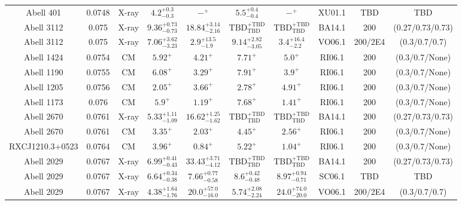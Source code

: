 \begin{table}
\begin{tabular}{cccccccccc}
Abell 401 & 0.0748 & X-ray & ${4.2}^{+0.3}_{-0.3}$ & ${-}^{+}_{}$ & ${5.5}^{+0.4}_{-0.4}$ & ${-}^{+}_{}$ & XU01.1 & TBD & TBD \\
Abell 3112 & 0.075 & X-ray & ${9.36}^{+0.73}_{-0.73}$ & ${18.84}^{+3.14}_{-2.16}$ & ${\mathrm{TBD}}^{+\mathrm{TBD}}_{\mathrm{TBD}}$ & ${\mathrm{TBD}}^{+\mathrm{TBD}}_{\mathrm{TBD}}$ & BA14.1 & 200 & (0.27/0.73/0.73) \\
Abell 3112 & 0.075 & X-ray & ${7.06}^{+3.62}_{-3.23}$ & ${2.9}^{+13.5}_{-1.9}$ & ${9.14}^{+2.82}_{-3.05}$ & ${3.4}^{+16.4}_{-2.2}$ & VO06.1 & 200/2E4 & (0.3/0.7/0.7) \\
Abell 1424 & 0.0754 & CM & ${5.92}^{+}_{}$ & ${4.21}^{+}_{}$ & ${7.71}^{+}_{}$ & ${5.0}^{+}_{}$ & RI06.1 & 200 & (0.3/0.7/None) \\
Abell 1190 & 0.0755 & CM & ${6.08}^{+}_{}$ & ${3.29}^{+}_{}$ & ${7.91}^{+}_{}$ & ${3.9}^{+}_{}$ & RI06.1 & 200 & (0.3/0.7/None) \\
Abell 1205 & 0.0756 & CM & ${2.05}^{+}_{}$ & ${3.66}^{+}_{}$ & ${2.78}^{+}_{}$ & ${4.91}^{+}_{}$ & RI06.1 & 200 & (0.3/0.7/None) \\
Abell 1173 & 0.076 & CM & ${5.9}^{+}_{}$ & ${1.19}^{+}_{}$ & ${7.68}^{+}_{}$ & ${1.41}^{+}_{}$ & RI06.1 & 200 & (0.3/0.7/None) \\
Abell 2670 & 0.0761 & X-ray & ${5.33}^{+1.11}_{-1.09}$ & ${16.62}^{+1.25}_{-1.62}$ & ${\mathrm{TBD}}^{+\mathrm{TBD}}_{\mathrm{TBD}}$ & ${\mathrm{TBD}}^{+\mathrm{TBD}}_{\mathrm{TBD}}$ & BA14.1 & 200 & (0.27/0.73/0.73) \\
Abell 2670 & 0.0761 & CM & ${3.35}^{+}_{}$ & ${2.03}^{+}_{}$ & ${4.45}^{+}_{}$ & ${2.56}^{+}_{}$ & RI06.1 & 200 & (0.3/0.7/None) \\
RXCJ1210.3+0523 & 0.0764 & CM & ${3.96}^{+}_{}$ & ${0.84}^{+}_{}$ & ${5.22}^{+}_{}$ & ${1.04}^{+}_{}$ & RI06.1 & 200 & (0.3/0.7/None) \\
Abell 2029 & 0.0767 & X-ray & ${6.99}^{+0.41}_{-0.43}$ & ${33.43}^{+3.71}_{-4.12}$ & ${\mathrm{TBD}}^{+\mathrm{TBD}}_{\mathrm{TBD}}$ & ${\mathrm{TBD}}^{+\mathrm{TBD}}_{\mathrm{TBD}}$ & BA14.1 & 200 & (0.27/0.73/0.73) \\
Abell 2029 & 0.0767 & X-ray & ${6.64}^{+0.34}_{-0.38}$ & ${7.66}^{+0.77}_{-0.58}$ & ${8.6}^{+0.42}_{-0.48}$ & ${8.97}^{+0.94}_{-0.71}$ & SC06.1 & TBD & TBD \\
Abell 2029 & 0.0767 & X-ray & ${4.38}^{+1.64}_{-1.76}$ & ${20.0}^{+57.0}_{-16.0}$ & ${5.74}^{+2.08}_{-2.24}$ & ${24.0}^{+74.0}_{-20.0}$ & VO06.1 & 200/2E4 & (0.3/0.7/0.7) \\

\end{tabular}
\end{table}
